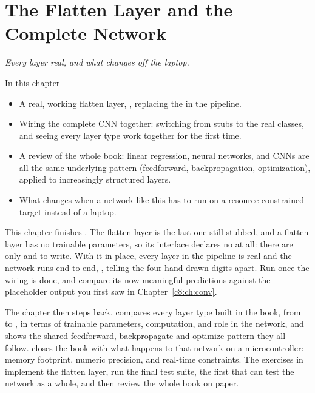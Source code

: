 
\chapter{The Flatten Layer and the Complete Network}
\label{c10:ch:flatten}

{\large\itshape Every layer real, and what changes off the laptop.\par}

\begin{chapterbox}{In this chapter}
\begin{itemize}
  \item A real, working flatten layer, , replacing the
     in the  pipeline.
  \item Wiring the complete CNN together: switching  from stubs to the real
    classes, and seeing every layer type work together for the first time.
  \item A review of the whole book: linear regression, neural networks, and CNNs are all the same
    underlying pattern (feedforward, backpropagation, optimization), applied to increasingly
    structured layers.
  \item What changes when a network like this has to run on a resource-constrained target instead
    of a laptop.
\end{itemize}
\end{chapterbox}

This chapter finishes . The flatten layer is the last one still stubbed, and a
flatten layer has no trainable parameters, so its interface declares no  at all:
there are only  and  to write. With it in place, every
layer in the pipeline is real and the network runs end to end,
, telling the four hand-drawn digits
apart. Run  once the wiring is done, and compare its now meaningful predictions against
the placeholder output you first saw in Chapter~\ref{c8:ch:conv}.

The chapter then steps back.  compares every layer type built in the book,
from  to , in terms of trainable parameters, computation, and role in the
network, and shows the shared feedforward, backpropagate and optimize pattern they all follow.
 closes the book with what happens to that network on a microcontroller:
memory footprint, numeric precision, and real-time constraints. The exercises in
 implement the flatten layer, run the final test suite, the first that can
test the network as a whole, and then review the whole book on paper.






